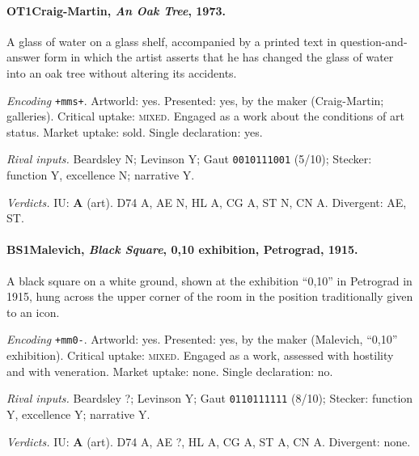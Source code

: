 \paragraph{OT1\enspace Craig-Martin, \emph{An Oak Tree}, 1973.}
A glass of water on a glass shelf, accompanied by a printed text in question-and-answer form in which the artist asserts that he has changed the glass of water into an oak tree without altering its accidents.\par
\noindent\textit{Encoding} \texttt{+mms+}. Artworld: yes. Presented: yes, by the maker (Craig-Martin; galleries). Critical uptake: \textsc{mixed}. Engaged as a work about the conditions of art status. Market uptake: sold. Single declaration: yes.\par
\noindent\textit{Rival inputs.} Beardsley N; Levinson Y; Gaut \texttt{0010111001} (5/10); Stecker: function Y, excellence N; narrative Y.\par
\noindent\textit{Verdicts.} IU: \textbf{A} (art). D74 A, AE N, HL A, CG A, ST N, CN A. Divergent: AE, ST.\par

\paragraph{BS1\enspace Malevich, \emph{Black Square}, 0,10 exhibition, Petrograd, 1915.}
A black square on a white ground, shown at the exhibition \enquote{0,10} in Petrograd in 1915, hung across the upper corner of the room in the position traditionally given to an icon.\par
\noindent\textit{Encoding} \texttt{+mm0-}. Artworld: yes. Presented: yes, by the maker (Malevich, \enquote{0,10} exhibition). Critical uptake: \textsc{mixed}. Engaged as a work, assessed with hostility and with veneration. Market uptake: none. Single declaration: no.\par
\noindent\textit{Rival inputs.} Beardsley ?; Levinson Y; Gaut \texttt{0110111111} (8/10); Stecker: function Y, excellence Y; narrative Y.\par
\noindent\textit{Verdicts.} IU: \textbf{A} (art). D74 A, AE ?, HL A, CG A, ST A, CN A. Divergent: none.\par

